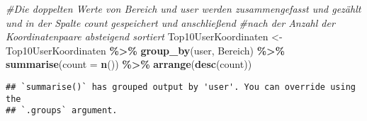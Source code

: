 \documentclass[
]{article}
\newenvironment{Shaded}{\begin{snugshade}}{\end{snugshade}}
\newcommand{\AttributeTok}[1]{\textcolor[rgb]{0.13,0.29,0.53}{#1}}
\newcommand{\CommentTok}[1]{\textcolor[rgb]{0.56,0.35,0.01}{\textit{#1}}}
\newcommand{\FunctionTok}[1]{\textcolor[rgb]{0.13,0.29,0.53}{\textbf{#1}}}
\newcommand{\NormalTok}[1]{#1}
\newcommand{\OtherTok}[1]{\textcolor[rgb]{0.56,0.35,0.01}{#1}}
\newcommand{\SpecialCharTok}[1]{\textcolor[rgb]{0.81,0.36,0.00}{\textbf{#1}}}
\begin{document}
\begin{Shaded}
\begin{Highlighting}[]
\CommentTok{\#Die doppelten Werte von Bereich und user werden zusammengefasst und gezählt und in der Spalte count gespeichert und anschließend}
\CommentTok{\#nach der Anzahl der Koordinatenpaare absteigend sortiert}
\NormalTok{Top10UserKoordinaten }\OtherTok{\textless{}{-}}\NormalTok{ Top10UserKoordinaten }\SpecialCharTok{\%\textgreater{}\%} \FunctionTok{group\_by}\NormalTok{(user, Bereich) }\SpecialCharTok{\%\textgreater{}\%} \FunctionTok{summarise}\NormalTok{(}\AttributeTok{count =} \FunctionTok{n}\NormalTok{()) }\SpecialCharTok{\%\textgreater{}\%} \FunctionTok{arrange}\NormalTok{(}\FunctionTok{desc}\NormalTok{(count))}
\end{Highlighting}
\end{Shaded}

\begin{verbatim}
## `summarise()` has grouped output by 'user'. You can override using the
## `.groups` argument.
\end{verbatim}
\end{document}
